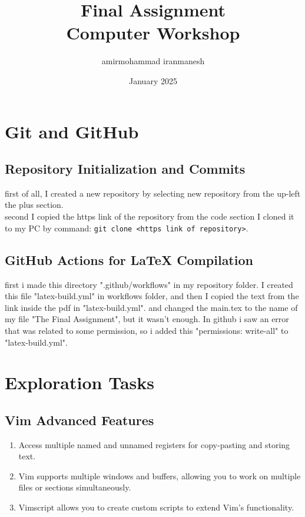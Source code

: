 \documentclass{article}
\title{Final Assignment\\[0.2cm]Computer Workshop}
\author{amirmohammad iranmanesh}
\date{January 2025}
\begin{document}
\maketitle
\newpage
\section{Git and GitHub}
    \subsection{Repository Initialization and Commits}
    first of all, I created a new repository by selecting new repository from the up-left the plus section.
    \\ second I copied the https link of the repository from the code section I cloned it to my PC by command: \texttt{git clone \textless https link of repository\textgreater}.
    \subsection{GitHub Actions for LaTeX Compilation}
     first i made this directory ".github/workflows" in my repository folder. I created this file "latex-build.yml" in workflows folder, and then I copied the text from the link inside the pdf in "latex-build.yml". and changed the main.tex to the name of my file "The Final Assignment", but it wasn't enough. In github i saw an error that was related to some permission, so i added this "permissions: write-all" to  "latex-build.yml".

\section{Exploration Tasks}
    \subsection{Vim Advanced Features}
    \begin{enumerate}
        \item Access multiple named and unnamed registers for copy-pasting and storing text.
        \item Vim supports multiple windows and buffers, allowing you to work on multiple files or sections simultaneously.
        \item Vimscript allows you to create custom scripts to extend Vim's functionality.
    \end{enumerate}
\end{document}
